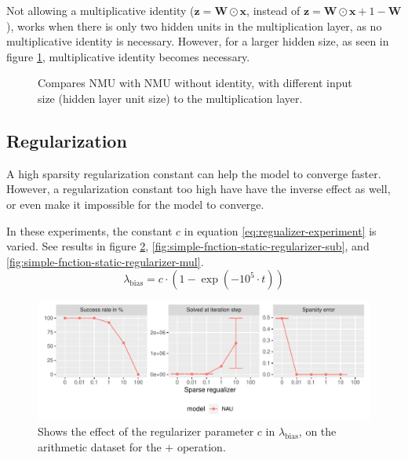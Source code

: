 Not allowing a multiplicative identity ($\mathbf{z} = \mathbf{W} \odot \mathbf{x}$, instead of $\mathbf{z} = \mathbf{W} \odot \mathbf{x} + 1 - \mathbf{W}$), works when there is only two hidden units in the multiplication layer, as no multiplicative identity is necessary. However, for a larger hidden size, as seen in figure \ref{fig:simple-function-static-ablation-hidden-size}, multiplicative identity becomes necessary.
\begin{figure}[h]
\centering
\caption{Compares NMU with NMU without identity, with different input size (hidden layer unit size) to the multiplication layer.}
\label{fig:simple-function-static-ablation-hidden-size}
\end{figure}

\subsection{Regularization}
\label{sec:appendix:simple-function-task:regualization}
A high sparsity regularization constant can help the model to converge faster. However, a regularization constant too high have have the inverse effect as well, or even make it impossible for the model to converge.

In these experiments, the constant $c$ in equation \ref{eq:regualizer-experiment} is varied. See results in figure \ref{fig:simple-fnction-static-regularizer-add}, \ref{fig:simple-fnction-static-regularizer-sub}, and \ref{fig:simple-fnction-static-regularizer-mul}.
\begin{equation}
\lambda_{\mathrm{bias}} = c \cdot (1 - \exp(-10^5 \cdot t))
\label{eq:regualizer-experiment}
\end{equation}

\begin{figure}[h]
\centering
\includegraphics[width=\linewidth]{results/simple_function_static_regualization_add.pdf}
\caption{Shows the effect of the regularizer parameter $c$ in $\lambda_{\mathrm{bias}}$, on the  arithmetic dataset for the $\bm{+}$ operation.}
\label{fig:simple-fnction-static-regularizer-add}
\end{figure}

